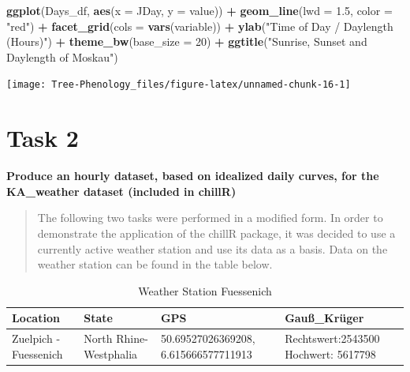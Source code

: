 \documentclass[
]{book}
\newenvironment{Shaded}{\begin{snugshade}}{\end{snugshade}}
\newcommand{\DataTypeTok}[1]{\textcolor[rgb]{0.13,0.29,0.53}{#1}}
\newcommand{\DecValTok}[1]{\textcolor[rgb]{0.00,0.00,0.81}{#1}}
\newcommand{\FloatTok}[1]{\textcolor[rgb]{0.00,0.00,0.81}{#1}}
\newcommand{\KeywordTok}[1]{\textcolor[rgb]{0.13,0.29,0.53}{\textbf{#1}}}
\newcommand{\NormalTok}[1]{#1}
\newcommand{\OperatorTok}[1]{\textcolor[rgb]{0.81,0.36,0.00}{\textbf{#1}}}
\newcommand{\StringTok}[1]{\textcolor[rgb]{0.31,0.60,0.02}{#1}}
\begin{document}
\begin{Shaded}
\begin{Highlighting}[]
\KeywordTok{ggplot}\NormalTok{(Days_df, }\KeywordTok{aes}\NormalTok{(}\DataTypeTok{x =}\NormalTok{ JDay, }\DataTypeTok{y =}\NormalTok{ value)) }\OperatorTok{+}\StringTok{ }\KeywordTok{geom_line}\NormalTok{(}\DataTypeTok{lwd =} \FloatTok{1.5}\NormalTok{, }\DataTypeTok{color =} \StringTok{"red"}\NormalTok{) }\OperatorTok{+}\StringTok{ }\KeywordTok{facet_grid}\NormalTok{(}\DataTypeTok{cols =} \KeywordTok{vars}\NormalTok{(variable)) }\OperatorTok{+}
\StringTok{  }\KeywordTok{ylab}\NormalTok{(}\StringTok{"Time of Day / Daylength (Hours)"}\NormalTok{) }\OperatorTok{+}\StringTok{ }\KeywordTok{theme_bw}\NormalTok{(}\DataTypeTok{base_size =} \DecValTok{20}\NormalTok{) }\OperatorTok{+}
\StringTok{  }\KeywordTok{ggtitle}\NormalTok{(}\StringTok{"Sunrise, Sunset and Daylength of Moskau"}\NormalTok{)}
\end{Highlighting}
\end{Shaded}

\texttt{[image: Tree-Phenology\_files/figure-latex/unnamed-chunk-16-1]}

\hypertarget{task-2-3}{%
\section{Task 2}\label{task-2-3}}

\textbf{Produce an hourly dataset, based on idealized daily curves, for the KA\_weather dataset (included in chillR)}

\begin{quote}
The following two tasks were performed in a modified form. In order to demonstrate the application of the chillR package, it was decided to use a currently active weather station and use its data as a basis. Data on the weather station can be found in the table below.
\end{quote}

\begin{table}

\caption{\label{tab:unnamed-chunk-17}Weather Station Fuessenich}
\fontsize{10}{12}\selectfont
\begin{tabular}[t]{l|l|l|l}
\hline
Location & State & GPS & Gauß\_Krüger\\
\hline
Zuelpich - Fuessenich & North Rhine-Westphalia & 50.69527026369208, 6.615666577711913 & Rechtswert:2543500 Hochwert: 5617798\\
\hline
\end{tabular}
\end{table}
\end{document}
